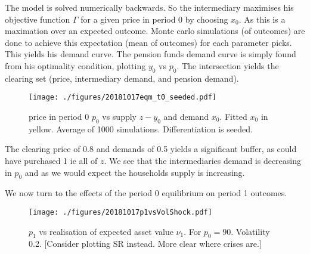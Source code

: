 \documentclass[11pt]{article}
\newtheorem{proposition}{Proposition}
\begin{document}
\begin{appendices}
\iffalse
\begin{proposition}[Prop of risk premium / sharpe ratios]
The risk premium is increasing in buffer size.
This is expected return over volatility $SR = (p_0 - \mu)/ \sigma$. $\lambda = f(p-\mu) = f((W^I)^{-1})$. Do I get a risk premia for regulatory cliff effect???
\end{proposition}

\begin{figure}[h]
\centering
\texttt{[image: ./figures/SR0vsTheta0.pdf]}
\caption{Price of risk (Sharpe Ratio) vs buffer size. Shown for $\sigma_x = 0.1, \gamma = 3$. }
\label{f_probSRvsBuffer2}
\end{figure}
\fi

\iffalse
\begin{proposition}[[Include something about assets moving from financial intermediaries to households?]]

\end{proposition}
\fi

\iffalse
The model is solved numerically backwards. So the intermediary maximises his objective function $\Gamma$ for a given price in period 0 by choosing $x_0$. As this is a maximation over an expected outcome. Monte carlo simulations (of outcomes) are done to achieve this expectation (mean of outcomes) for each parameter picks. This yields his demand curve. The pension funds demand curve is simply found from his optimality condition, plotting $y_0$ vs $p_0$. The intersection yields the clearing set (price, intermediary demand, and pension demand).

\begin{figure}[h]
\centering
\texttt{[image: ./figures/20181017eqm\_t0\_seeded.pdf]}
\caption{price in period 0 $p_0$ vs supply $z-y_0$ and demand $x_0$. Fitted $x_0$ in yellow. Average of 1000 simulations. Differentiation is seeded.}
\end{figure}

The clearing price of 0.8 and demands of 0.5 yields a significant buffer, as could have purchased 1 ie all of $z$.  We see that the intermediaries demand is decreasing in $p_0$ and as we would expect the households supply is increasing.

We now turn to the effects of the period 0 equilibrium on period 1 outcomes.




\begin{figure}[h] 
\centering
\texttt{[image: ./figures/20181017p1vsVolShock.pdf]}
\caption{$p_1$ vs realisation of expected asset value  $\nu_1$. For $p_0 = 90$. Volatility 0.2. [Consider plotting SR instead. More clear where crises are.]}
\label{f_price1vsvolshock}
\end{figure}


\end{appendices}
\end{document}
